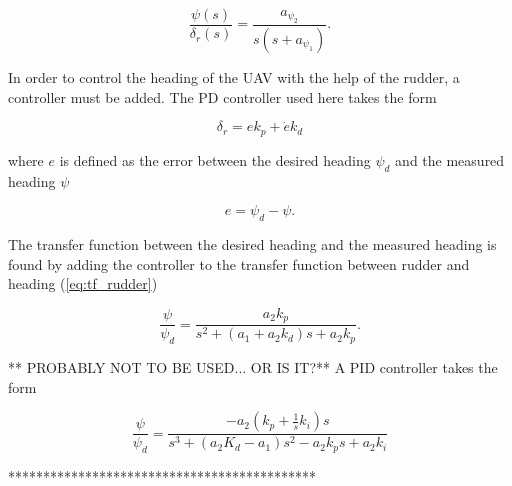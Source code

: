 \begin{equation}
	\label{eq:tf_rudder}
	\frac{\psi(s)}{\delta_r(s)} = \frac{a_{\psi_2}}{s(s+a_{\psi_1})}.
\end{equation}

In order to control the heading of the UAV with the help of the rudder, a controller must be added. The PD controller used here takes the form

\begin{equation}
	\delta_r = ek_p + \dot{e}k_d
\end{equation}

where $e$ is defined as the error between the desired heading $\psi_d$ and the measured heading $\psi$

\begin{equation}
	e = \psi_d - \psi.
\end{equation}

The transfer function between the desired heading and the measured heading is found by adding the controller to the transfer function between rudder and heading (\ref{eq:tf_rudder})

\begin{equation}
	\label{eq:rudder_PD}
	\frac{\psi}{\psi_d} = \frac{a_2k_p}{s^2 + (a_1+a_2k_d)s + a_2k_p}.
\end{equation}


** PROBABLY NOT TO BE USED... OR IS IT?**
A PID controller takes the form

\begin{equation}
	\label{eq:rudder_PID}
	\frac{\psi}{\psi_d} = \frac{-a_2(k_p + \frac{1}{s}k_i)s}{s^3 + (a_2K_d-a_1)s^2 - a_2k_ps + a_2k_i}
\end{equation}

********************************************
